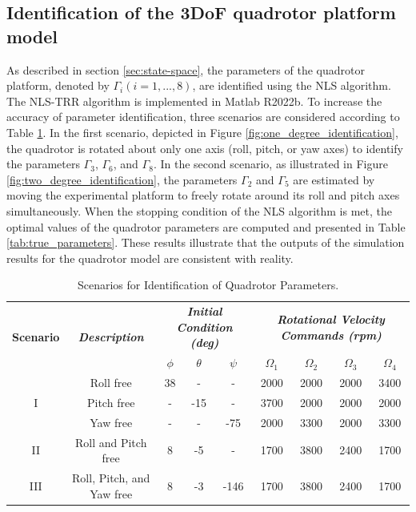 \documentclass[preprint,12pt,authoryear]{elsarticle}
\begin{document}
\subsection{Identification of the 3DoF quadrotor platform model}
\noindent As described in section \ref{sec:state-space}, the parameters of the quadrotor platform, denoted by $\Gamma_i (i=1, ..., 8)$, are identified using the NLS algorithm. The NLS-TRR algorithm is implemented in Matlab R2022b\textregistered.
To increase the accuracy of parameter identification, three scenarios are considered according to Table \ref{tab:identification}.
In the first scenario, depicted in Figure \ref{fig:one_degree_identification}, the quadrotor is rotated about only one axis (roll, pitch, or yaw axes) to identify the parameters $\Gamma_3$, $\Gamma_6$, and $\Gamma_8$.
In the second scenario, as illustrated in Figure \ref{fig:two_degree_identification}, the parameters $\Gamma_2$ and $\Gamma_5$ are estimated by moving the experimental platform to freely rotate around its roll and pitch axes simultaneously. %
When the stopping condition of the NLS algorithm is met, the optimal values of the quadrotor parameters are computed and presented in Table \ref{tab:true_parameters}. 
These results illustrate that the outputs of the simulation results for the quadrotor model are consistent with reality.
\begin{table}[H]
	\caption{Scenarios for Identification of Quadrotor Parameters.}
	\centering
	\begin{adjustbox}{max width=\textwidth}
	\begin{tabular}{*{9}{c}}
	\toprule
	\multirow{2}{*}{\textbf{Scenario}} & \multirow{2}{*}{\textbf{\textit{Description}}}
	& \multicolumn{3}{c}{\textbf{\textit{Initial Condition (deg)}}} &
	\multicolumn{4}{c}{\textbf{\textit{Rotational Velocity Commands (rpm)}}} \\
	\cmidrule(lr){3-5} \cmidrule(lr){6-9}
	& & $\phi$ & $\theta$ & $\psi$ & $\Omega_1$ & $\Omega_2$ & $\Omega_3$ & $\Omega_4$\\
	\midrule
	\multirow{3}{*}{I} & Roll free & 38 & - & - & 2000 & 2000 & 2000 & 3400\\
	& Pitch free & - & -15 & - & 3700 & 2000 & 2000 & 2000 \\
	& Yaw free & -& - &-75 & 2000 & 3300 & 2000 & 3300 \\
	\midrule
	II & Roll and Pitch free &8 & -5 & - & 1700 & 3800 & 2400 & 1700\\
	\midrule
	III & Roll, Pitch, and Yaw free &
	8 & -3 & -146 & 1700 & 3800 & 2400 & 1700 \\
	\bottomrule
	\end{tabular}
	\end{adjustbox}
	\label{tab:identification}
\end{table}
\end{document}
